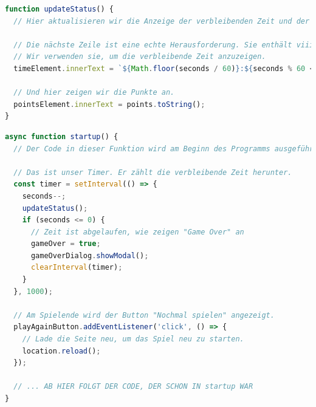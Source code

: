 \documentclass{article}
\begin{document}


    \begin{lstlisting}[language=JavaScript]
function updateStatus() {
  // Hier aktualisieren wir die Anzeige der verbleibenden Zeit und der Punkte.

  // Die nächste Zeile ist eine echte Herausforderung. Sie enthält viiiele Sonderzeichen.
  // Wir verwenden sie, um die verbleibende Zeit anzuzeigen.
  timeElement.innerText = `${Math.floor(seconds / 60)}:${seconds % 60 < 10 ? '0' : ''}${seconds % 60}`;

  // Und hier zeigen wir die Punkte an.
  pointsElement.innerText = points.toString();
}
    \end{lstlisting}

    \vspace{0.5cm}


    \begin{lstlisting}[language=JavaScript]
async function startup() {
  // Der Code in dieser Funktion wird am Beginn des Programms ausgeführt.

  // Das ist unser Timer. Er zählt die verbleibende Zeit herunter.
  const timer = setInterval(() => {
    seconds--;
    updateStatus();
    if (seconds <= 0) {
      // Zeit ist abgelaufen, wie zeigen "Game Over" an
      gameOver = true;
      gameOverDialog.showModal();
      clearInterval(timer);
    }
  }, 1000);

  // Am Spielende wird der Button "Nochmal spielen" angezeigt.
  playAgainButton.addEventListener('click', () => {
    // Lade die Seite neu, um das Spiel neu zu starten.
    location.reload();
  });

  // ... AB HIER FOLGT DER CODE, DER SCHON IN startup WAR
}
    \end{lstlisting}
\end{document}
